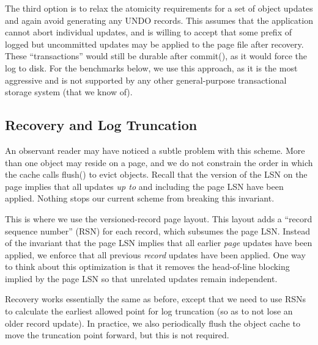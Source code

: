 \documentclass[10pt,letterpaper,twocolumn,english]{article}
\newcommand{\yad}{LLADD\xspace}
\begin{document}
The third option is to relax the atomicity requirements for a set of
object updates and again avoid generating any UNDO records. This
assumes that the application cannot abort individual updates, 
and is willing to
accept that some prefix of logged but uncommitted updates may 
be applied to the page
file after recovery. These ``transactions'' would still be durable
after commit(), as it would force the log to disk. 
For the benchmarks below, we
use this approach, as it is the most aggressive and is
not supported by any other general-purpose transactional 
storage system (that we know of).

\subsection{Recovery and Log Truncation}

An observant reader may have noticed a subtle problem with this
scheme.  More than one object may reside on a page, and we do not
constrain the order in which the cache calls flush() to evict objects.
Recall that the version of the LSN on the page implies that all
updates {\em up to} and including the page LSN have been applied.
Nothing stops our current scheme from breaking this invariant.  

This is where we use the versioned-record page layout. This layout adds a
``record sequence number'' (RSN) for each record, which subsumes the
page LSN.  Instead of the invariant that the page LSN implies that all
earlier {\em page} updates have been applied, we enforce that all
previous {\em record} updates have been applied.  One way to think about
this optimization is that it removes the head-of-line blocking implied
by the page LSN so that unrelated updates remain independent.

Recovery works essentially the same as before, except that we need to
use RSNs to calculate the earliest allowed point for log truncation
(so as to not lose an older record update).  In practice, we
also periodically flush the object cache to move the truncation point
forward, but this is not required.

\end{document}
